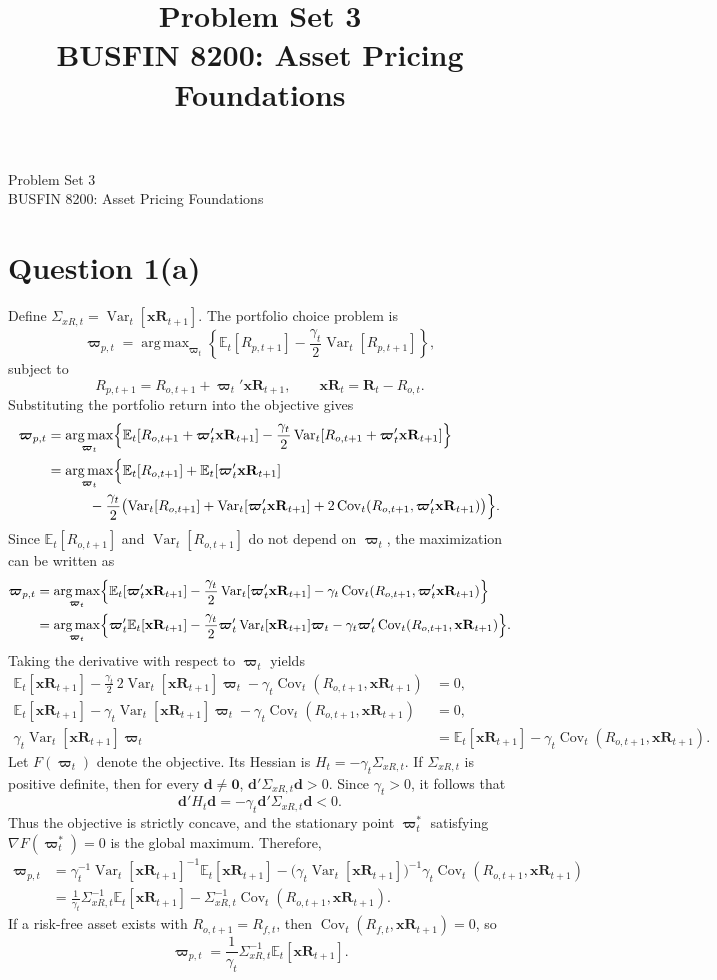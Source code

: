 \documentclass[11pt]{article}
\title{Problem Set 3\\\large BUSFIN 8200: Asset Pricing Foundations}
\author{}
\date{}
\newcommand{\Et}{\mathbb{E}_t}
\newcommand{\Vt}{\operatorname{Var}_t}
\newcommand{\Ct}{\operatorname{Cov}_t}
\newcommand{\wt}{\boldsymbol{\varpi}_t}
\newcommand{\xr}{\mathbf{xR}_{t+1}}
\DeclareMathOperator*{\argmax}{arg\,max}
\begin{document}
\setlength{\abovedisplayskip}{6pt}
\setlength{\belowdisplayskip}{6pt}
\begin{center}
{\Large Problem Set 3}\\[3pt]
BUSFIN 8200: Asset Pricing Foundations
\end{center}
\section*{Question 1(a)}
Define $\Sigma_{xR,t}=\Vt[\xr]$. The portfolio choice problem is
\begin{equation*}
\boldsymbol{\varpi}_{p,t}
=\argmax_{\wt}\left\{\Et[R_{p,t+1}]
-\frac{\gamma_t}{2}\Vt[R_{p,t+1}]\right\},
\end{equation*}
subject to
\[
R_{p,t+1}=R_{o,t+1}+\wt'\xr,
\qquad \mathbf{xR}_t=\mathbf{R}_t-R_{o,t}.
\]
Substituting the portfolio return into the objective gives
\begin{align*}
\boldsymbol{\varpi}_{p,t}
&=\argmax_{\wt}\Bigl\{
\Et[R_{o,t+1}+\wt'\xr]
-\frac{\gamma_t}{2}\Vt[R_{o,t+1}+\wt'\xr]\Bigr\}\\
&=\argmax_{\wt}\Bigl\{
\Et[R_{o,t+1}]+\Et[\wt'\xr]\\
&\hspace{3em}-\frac{\gamma_t}{2}\bigl(
\Vt[R_{o,t+1}]+\Vt[\wt'\xr]
+2\Ct(R_{o,t+1},\wt'\xr)\bigr)\Bigr\}.
\end{align*}
Since $\Et[R_{o,t+1}]$ and $\Vt[R_{o,t+1}]$ do not depend on $\wt$,
the maximization can be written as
\begin{align*}
\boldsymbol{\varpi}_{p,t}
&=\argmax_{\wt}\Bigl\{\Et[\wt'\xr]
-\frac{\gamma_t}{2}\Vt[\wt'\xr]
-\gamma_t\Ct(R_{o,t+1},\wt'\xr)\Bigr\}\\
&=\argmax_{\wt}\Bigl\{\wt'\Et[\xr]
-\frac{\gamma_t}{2}\wt'\Vt[\xr]\wt
-\gamma_t\wt'\Ct(R_{o,t+1},\xr)\Bigr\}.
\end{align*}
Taking the derivative with respect to $\wt$ yields
\begin{align*}
\Et[\xr]-\frac{\gamma_t}{2}\,2\Vt[\xr]\wt
-\gamma_t\Ct(R_{o,t+1},\xr)&=0,\\
\Et[\xr]-\gamma_t\Vt[\xr]\wt
-\gamma_t\Ct(R_{o,t+1},\xr)&=0,\\
\gamma_t\Vt[\xr]\wt
&=\Et[\xr]-\gamma_t\Ct(R_{o,t+1},\xr).
\end{align*}
Let $F(\wt)$ denote the objective. Its Hessian is
$H_t=-\gamma_t\Sigma_{xR,t}$. If $\Sigma_{xR,t}$ is positive definite,
then for every $\mathbf d\ne\mathbf 0$,
$\mathbf d'\Sigma_{xR,t}\mathbf d>0$. Since $\gamma_t>0$, it follows that
\[
\mathbf d'H_t\mathbf d=-\gamma_t\mathbf d'\Sigma_{xR,t}\mathbf d<0.
\]
Thus the objective is strictly concave, and the stationary point
$\wt^*$ satisfying $\nabla F(\wt^*)=0$ is the global maximum.
Therefore,
\begin{align*}
\boldsymbol{\varpi}_{p,t}
&=\gamma_t^{-1}\Vt[\xr]^{-1}\Et[\xr]
-\bigl(\gamma_t\Vt[\xr]\bigr)^{-1}
\gamma_t\Ct(R_{o,t+1},\xr)\\
&=\frac{1}{\gamma_t}\Sigma_{xR,t}^{-1}\Et[\xr]
-\Sigma_{xR,t}^{-1}\Ct(R_{o,t+1},\xr).
\end{align*}
If a risk-free asset exists with $R_{o,t+1}=R_{f,t}$, then $\Ct(R_{f,t},\xr)=0$, so
\[
\boxed{\boldsymbol{\varpi}_{p,t}
=\frac{1}{\gamma_t}\Sigma_{xR,t}^{-1}\Et[\xr].}
\]
\clearpage
\end{document}

